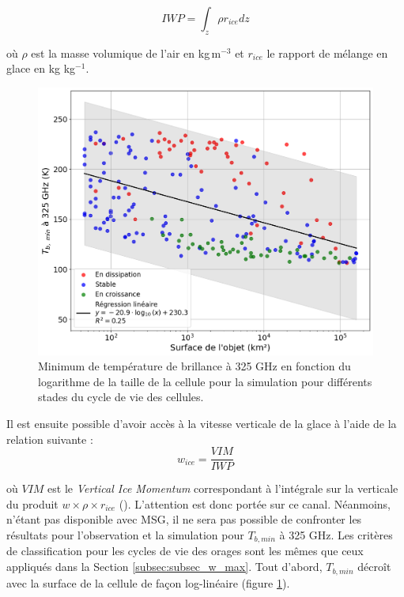 \documentclass[12pt]{article}
\begin{document}
\begin{multicols}{2}
\begin{equation}
    IWP = \int_z \rho r_{ice} dz
\end{equation}

\noindent où $\rho$ est la masse volumique de l'air en kg\,m$^{-3}$ et $r_{ice}$ le rapport de mélange en glace en kg kg$^{-1}$. 

\begin{figure}[H]
    \centering
    \includegraphics[width=\linewidth]{Figures/min_tb_vs_size.png}
    \caption{Minimum de température de brillance à 325 GHz en fonction du logarithme de la taille de la cellule pour la simulation pour différents stades du cycle de vie des cellules.}
    \label{fig:tb_min_vs_size}
\end{figure}

\vspace{-0.3cm
}
Il est ensuite possible d'avoir accès à la vitesse verticale de la glace à l'aide de la relation suivante :
\vspace{-2mm}
\begin{equation}
    w_{ice} = \frac{VIM}{IWP}
\end{equation}

\noindent où $VIM$ est le \textit{Vertical Ice Momentum} correspondant à l'intégrale sur la verticale du produit $w \times \rho \times r_{ice}$ (\cite{Chaboureau}). L'attention est donc portée sur ce canal. Néanmoins, n'étant pas disponible avec MSG, il ne sera pas possible de confronter les résultats pour l'observation et la simulation pour $T_{b, min}$ à 325 GHz. Les critères de classification pour les cycles de vie des orages sont les mêmes que ceux appliqués dans la Section \ref{subsec:subsec_w_max}. Tout d'abord, $T_{b, min}$ décroît avec la surface de la cellule de façon log-linéaire (figure \ref{fig:tb_min_vs_size}). 


\end{multicols}
\end{document}
